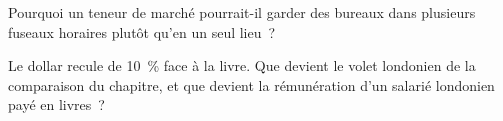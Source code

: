 \begin{interviewq}\label{iq:in:locations:5}
Pourquoi un teneur de marché pourrait-il garder des bureaux dans plusieurs fuseaux horaires plutôt qu'en un seul lieu~?
\end{interviewq}

\begin{interviewq}\label{iq:in:locations:6}
Le dollar recule de 10~\% face à la livre. Que devient le volet londonien de la comparaison du chapitre, et
que devient la rémunération d'un salarié londonien payé en livres~?
\end{interviewq}
